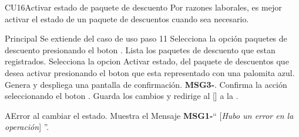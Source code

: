 \begin{UseCase}{CU16}{Activar estado de paquete de descuento}{
		Por razones laborales, es mejor activar el estado de un paquete de descuentos cuando sea necesario.
	}
	\end{UseCase}




	\begin{UCtrayectoria}{Principal}
		\UCpaso Se extiende del caso de uso  paso 11
		\UCpaso[\UCactor] Selecciona la opción paquetes de descuento presionando el boton .
		\UCpaso Lista los paquetes de descuento que estan registrados. 
		\UCpaso[\UCactor] Selecciona la opcion Activar estado, del paquete de descuentos que desea activar presionando el boton  que esta representado con una palomita azul.		
		\UCpaso Genera y despliega una pantalla de confirmación.  {\bf MSG3-}.
		\UCpaso[\UCactor] Confirma la acción seleccionando el boton . 
		\UCpaso Guarda los cambios y redirige al [\UCactor] a la  .
	\end{UCtrayectoria}




\begin{UCtrayectoriaA}{A}{Error al cambiar el estado.}
			\UCpaso Muestra el Mensaje {\bf MSG1-}`` [{\em Hubo un error en la operación}] ''.
			
		\end{UCtrayectoriaA}

